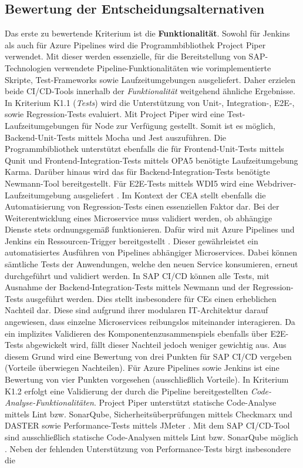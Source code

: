 \subsection{Bewertung der Entscheidungsalternativen}
\label{sec:Bewertung}
Das erste zu bewertende Kriterium ist die \textbf{Funktionalität}. Sowohl für Jenkins als auch für Azure Pipelines wird die Programmbibliothek Project Piper verwendet. Mit dieser werden essenzielle, für die Bereitstellung von SAP-Technologien verwendete Pipeline-Funktionalitäten wie vorimplementierte Skripte, Test-Frameworks sowie Laufzeitumgebungen ausgeliefert. Daher erzielen beide CI/CD-Tools innerhalb der \textit{Funktionalität} weitgehend ähnliche Ergebnisse.\\ In Kriterium K1.1 (\textit{Tests}) wird die Unterstützung von Unit-, Integration-, E2E-, sowie Regression-Tests evaluiert. Mit Project Piper wird eine Test-Laufzeitumgebungen für Node zur Verfügung gestellt. Somit ist es möglich, Backend-Unit-Tests mittels Mocha und Jest auszuführen. Die Programmbibliothek unterstützt ebenfalls die für Frontend-Unit-Tests mittels Qunit und Frontend-Integration-Tests mittels OPA5 benötigte Laufzeitumgebung Karma. Darüber hinaus wird das für Backend-Integration-Tests benötigte Newmann-Tool bereitgestellt. Für E2E-Tests mittels WDI5 wird eine Webdriver-Laufzeitumgebung ausgeliefert \cite[Z. 66 ff.]{TestDeveloperSAPHyperspaceAdoption&Onboarding.}. Im Kontext der CEA stellt ebenfalls die Automatisierung von Regression-Tests einen essenziellen Faktor dar. Bei der Weiterentwicklung eines Microservice muss validiert werden, ob abhängige Dienste stets ordnungsgemäß funktionieren. Dafür wird mit Azure Pipelines und Jenkins ein Ressourcen-Trigger bereitgestellt \cite{Steved0x.20230410}\cite{.20230417}. Dieser gewährleistet ein automatisiertes Ausführen von Pipelines abhängiger Microservices. Dabei können sämtliche Tests der Anwendungen, welche den neuen Service konsumieren, erneut durchgeführt und validiert werden. In SAP CI/CD können alle Tests, mit Ausnahme der Backend-Integration-Tests mittels Newmann und der Regression-Tests ausgeführt werden. Dies stellt insbesondere für CEs einen erheblichen Nachteil dar. Diese sind aufgrund ihrer modularen IT-Architektur darauf angewiesen, dass einzelne Microservices reibungslos miteinander interagieren. Da ein implizites Validieren des Komponentenzusammenspiels ebenfalls über E2E-Tests abgewickelt wird, fällt dieser Nachteil jedoch weniger gewichtig aus. Aus diesem Grund wird eine Bewertung von drei Punkten für SAP CI/CD vergeben (Vorteile überwiegen Nachteilen). Für Azure Pipelines sowie Jenkins ist eine Bewertung von vier Punkten vorgesehen (ausschließlich Vorteile). In Kriterium K1.2 erfolgt eine Validierung der durch die Pipeline bereitgestellten \textit{Code-Analyse-Funktionalitäten}. Project Piper unterstützt statische Code-Analyse mittels Lint bzw. SonarQube, Sicherheitsüberprüfungen mittels Checkmarx und DASTER sowie Performance-Tests mittels JMeter \cite[Z. 40 ff.]{ProductManagerSAPHyperspaceSecurityTools.}. Mit dem SAP CI/CD-Tool sind ausschließlich statische Code-Analysen mittels Lint bzw. SonarQube möglich \cite[Z. 50 ff.]{ProductOwnerSAPBTPProd&Infra.}. Neben der fehlenden Unterstützung von Performance-Tests birgt insbesondere die 